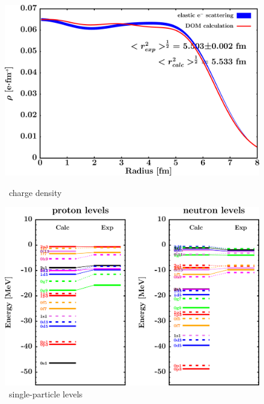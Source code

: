 \begin{figure}[hbtp]
    \centering
    \begin{minipage}{0.42\textwidth}
        \centering
        \includegraphics[width=\textwidth]{figures/pb208_chargeDensity.png}
        \caption*{\pbEight\ charge density}
        \label{DOMFitData_pb208_chargeDensity}
    \end{minipage}\hspace{6pt}
    \begin{minipage}{0.42\textwidth}
        \centering
        \includegraphics[width=\textwidth]{figures/pb208_SPLevels.png}
        \caption*{\pbEight\ single-particle levels}
        \label{DOMFitData_pb208_SPLevels}
    \end{minipage}
\end{figure}
